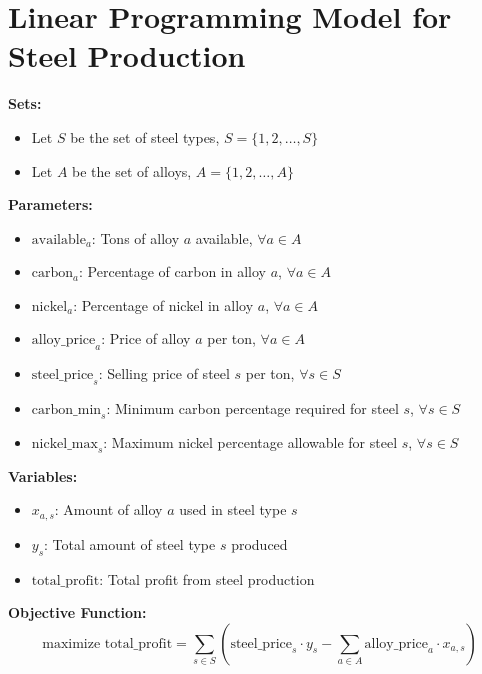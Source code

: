 \documentclass{article}
\begin{document}
\section*{Linear Programming Model for Steel Production}

\textbf{Sets:}
\begin{itemize}
    \item Let \( S \) be the set of steel types, \( S = \{1, 2, \ldots, S\} \)
    \item Let \( A \) be the set of alloys, \( A = \{1, 2, \ldots, A\} \)
\end{itemize}

\textbf{Parameters:}
\begin{itemize}
    \item \( \text{available}_a \): Tons of alloy \( a \) available, \( \forall a \in A \)
    \item \( \text{carbon}_{a} \): Percentage of carbon in alloy \( a \), \( \forall a \in A \)
    \item \( \text{nickel}_{a} \): Percentage of nickel in alloy \( a \), \( \forall a \in A \)
    \item \( \text{alloy\_price}_{a} \): Price of alloy \( a \) per ton, \( \forall a \in A \)
    \item \( \text{steel\_price}_{s} \): Selling price of steel \( s \) per ton, \( \forall s \in S \)
    \item \( \text{carbon\_min}_{s} \): Minimum carbon percentage required for steel \( s \), \( \forall s \in S \)
    \item \( \text{nickel\_max}_{s} \): Maximum nickel percentage allowable for steel \( s \), \( \forall s \in S \)
\end{itemize}

\textbf{Variables:}
\begin{itemize}
    \item \( x_{a,s} \): Amount of alloy \( a \) used in steel type \( s \)
    \item \( y_s \): Total amount of steel type \( s \) produced
    \item \( \text{total\_profit} \): Total profit from steel production
\end{itemize}

\textbf{Objective Function:}
\[
\text{maximize } \text{total\_profit} = \sum_{s \in S} \left( \text{steel\_price}_{s} \cdot y_s - \sum_{a \in A} \text{alloy\_price}_{a} \cdot x_{a,s} \right)
\]
\end{document}
